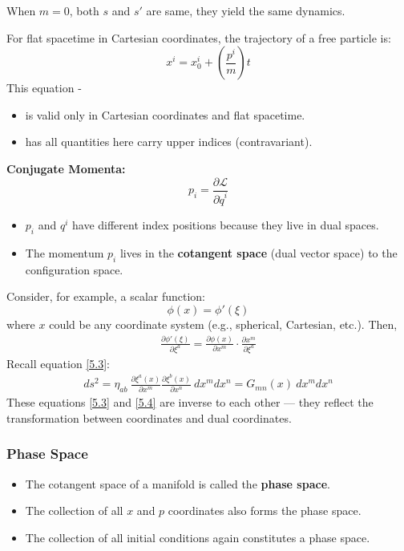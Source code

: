 \documentclass[14pt]{article} %
\begin{document}
When $m = 0$, both $s$ and $s'$ are same, they yield the same dynamics.
\begin{tcolorbox}[ title=\textbf{Note:}]
For flat spacetime in Cartesian coordinates, the trajectory of a free particle is:
\[
x^i = x^i_0 + \left( \frac{p^i}{m} \right)t
\]
This equation -
\begin{itemize}
    \item is valid only in Cartesian coordinates and flat spacetime.
    \item has all quantities here carry upper indices (contravariant).
\end{itemize}

\vspace{1em}
\noindent
\textbf{Conjugate Momenta:}
\[
p_i = \frac{\partial \mathcal{L}}{\partial \dot{q}^i}
\]

\begin{itemize}
    \item $p_i$ and $q^i$ have different index positions because they live in dual spaces.
    \item The momentum $p_i$ lives in the \textbf{cotangent space} (dual vector space) to the configuration space.
\end{itemize}
\end{tcolorbox}
Consider, for example, a scalar function: 
$$\phi(x) = \phi'(\xi)$$
where $x$ could be any coordinate system (e.g., spherical, Cartesian, etc.). Then,
\begin{align*}
    \frac{\partial \phi'(\xi)}{\partial \xi^a} 
    = \frac{\partial \phi(x)}{\partial x^m} \cdot \frac{\partial x^m}{\partial \xi^a} \tag{5.4} \label{5.4}
\end{align*}
Recall equation \eqref{5.3}:
\begin{align*}
    ds^2 = \eta_{ab}~ \frac{\partial \xi^a(x)}{\partial x^m} \frac{\partial \xi^b(x)}{\partial x^n}~ dx^m dx^n = G_{mn}(x)~ dx^m dx^n
\end{align*}
These equations \eqref{5.3} and \eqref{5.4} are inverse to each other — they reflect the transformation between coordinates and dual coordinates.
\begin{tcolorbox}[ title=\textbf{Note:}]
\subsubsection*{Phase Space}
\begin{itemize}
    \item The cotangent space of a manifold is called the \textbf{phase space}.
    \item The collection of all $x$ and $p$ coordinates also forms the phase space.
    \item The collection of all initial conditions again constitutes a phase space.
\end{itemize}
\end{tcolorbox}
\end{document}
